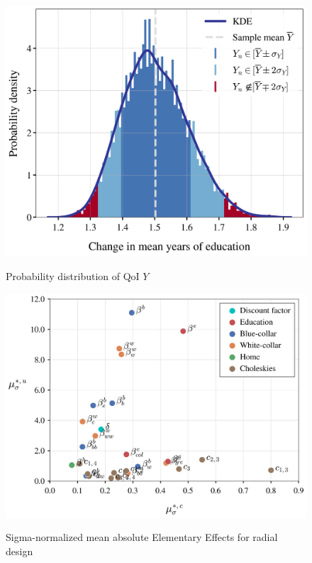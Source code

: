 \begin{figure}[H]
	\caption{Probability distribution of QoI $Y$}
	\centering
	\includegraphics[scale=0.55]{../scrypy/figures/distplot}
	\label{fig:dist}
\end{figure}

\begin{figure}[H]
	\caption[Sigma-normalized mean absolute EEs for radial design]{Sigma-normalized mean absolute Elementary Effects for radial design}
	\centering
	\includegraphics[scale=0.52]{../scrypy/figures/scatter_rad}
	\label{fig:rad}
\end{figure}


